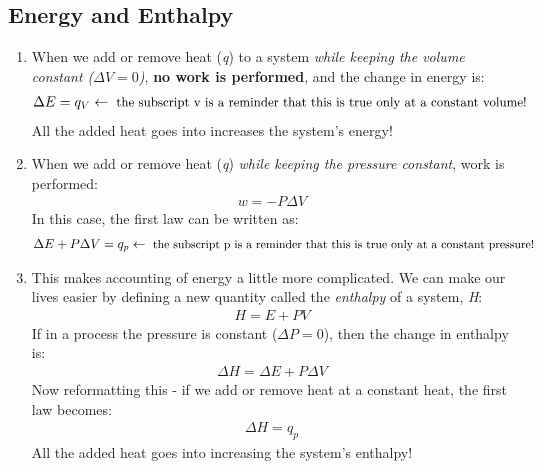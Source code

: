 \documentclass{article}  %
\begin{document}
\subsection*{Energy and Enthalpy}
\begin{enumerate}
    \item When we add or remove heat (\emph{q}) to a system \emph{while keeping the volume constant ($\Delta V = 0$)}, \textbf{no work is performed}, and the change in energy is:
        \begin{equation*}
            \begin{aligned}
                \Delta E = q_V \leftarrow\text{\small{  the subscript v is a reminder that this is true only at a constant volume!}}
            \end{aligned}
        \end{equation*}
        All the added heat goes into increases the system's energy!
    \item When we add or remove heat (\emph{q}) \emph{while keeping the pressure constant}, work is performed:
        \begin{equation*}
            \begin{aligned}
                w = -P\Delta V
            \end{aligned}
        \end{equation*}
        In this case, the first law can be written as:
        \begin{equation*}
            \begin{aligned}
                \Delta E + P\Delta V = q_p \leftarrow\text{\small{  the subscript p is a reminder that this is true only at a constant pressure!}}
            \end{aligned}
        \end{equation*}
    \item This makes accounting of energy a little more complicated. We can make our lives easier by defining a new quantity called the \emph{enthalpy} of a system, \emph{H}:
        \begin{equation*}
            \begin{aligned}
                H = E + PV 
            \end{aligned}
        \end{equation*}
        If in a process the pressure is constant ($\Delta P = 0$), then the change in enthalpy is:
        \begin{equation*}
            \begin{aligned}
                \Delta H = \Delta E + P \Delta V
            \end{aligned}
        \end{equation*}
        Now reformatting this - if we add or remove heat at a constant heat, the first law becomes:
        \begin{equation*}
            \begin{aligned}
                \Delta H = q_p
            \end{aligned}
        \end{equation*}
        All the added heat goes into increasing the system's enthalpy!
\end{enumerate}
\end{document}
